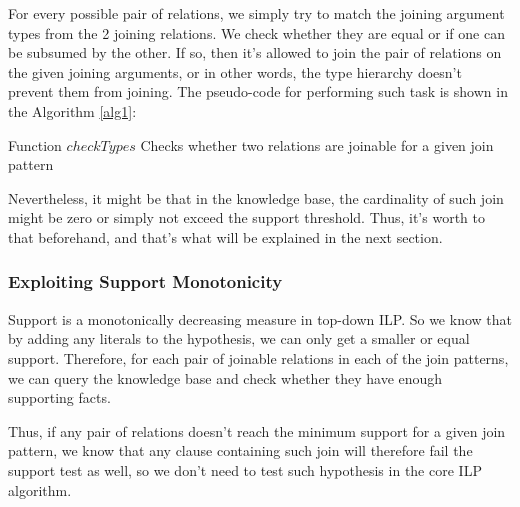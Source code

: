 For every possible pair of relations, we simply try to match the joining argument types from the 2 joining relations. We
check whether they are equal or if one can be subsumed by the other. If so, then it's allowed to join the pair of relations
on the given joining arguments, or in other words, the type hierarchy doesn't prevent them from joining. The pseudo-code
for performing such task is
shown in the Algorithm \ref{alg1}:

\begin{algorithm}[!h]
  \caption{Function $checkTypes$ \newline Checks whether two relations are joinable for a given join pattern}
 \label{alg1}
   {
  }
   {
  }
\end{algorithm}

Nevertheless, it might be that in the knowledge base, the cardinality of such join might be zero or simply not exceed
the support threshold. Thus, it's worth to that beforehand, and that's what will be explained in the next section.

\subsubsection{Exploiting Support Monotonicity}

Support is a monotonically decreasing measure in top-down ILP. So we know that by adding any
literals to the hypothesis, we can only get a smaller or equal support. Therefore, for each pair of joinable relations
in each of the join patterns, we can query the knowledge base and check whether they have enough supporting facts.

Thus, if any pair of relations doesn't reach the minimum support for a given join pattern, we know that any clause
containing such join will therefore fail the support test as well, so we don't need to test such hypothesis in the core
ILP algorithm.

